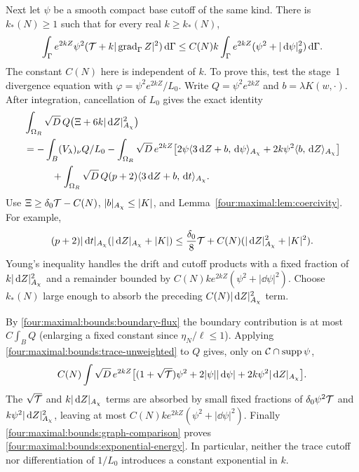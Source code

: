 Next let $\psi$ be a smooth compact base cutoff of the same kind.
There is $k_*(N)\ge1$ such that for every real $k\ge k_*(N)$,
\begin{equation}\label{four:maximal:bounds:exponential-energy}
 \int_\Gamma e^{2kZ}\psi^2
        (\mathcal T+k|\operatorname{grad}_\Gamma Z|^2)\,\mathrm d\Gamma
 \le C(N)k\int_\Gamma e^{2kZ}
               (\psi^2+|\,\mathrm d\psi|_g^2)\,\mathrm d\Gamma.
\end{equation}
The constant $C(N)$ here is independent of $k$. To prove this, test
the stage~1 divergence equation with
$\varphi=\psi^2e^{2kZ}/L_0$. Write
$Q=\psi^2e^{2kZ}$ and $b=\lambda K(w,\cdot)$.
After integration, cancellation of $L_0$ gives the exact identity
\begin{align*}
 &\int_{\Omega_R}\sqrt D\,Q
       \bigl(\Xi+6k|\,\mathrm d Z|_{A_\chi}^2\bigr)\\
 &=-\int_B(V_\lambda)_\nu Q/L_0
   -\int_{\Omega_R}\sqrt D\,e^{2kZ}
       \bigl[2\psi\langle3\,\mathrm d Z+b,\,\mathrm d\psi\rangle_{A_\chi}
          +2k\psi^2\langle b,\,\mathrm d Z\rangle_{A_\chi}\bigr]\\
 &\hspace{1cm}
   +\int_{\Omega_R}\sqrt D\,Q(p+2)
                    \langle3\,\mathrm d Z+b,\,\mathrm d t\rangle_{A_\chi}.
\end{align*}
Use $\Xi\ge\delta_0\mathcal T-C(N)$, $|b|_{A_\chi}\le|K|$, and
Lemma~\ref{four:maximal:lem:coercivity}. For example,
\[
 (p+2)|\,\mathrm d t|_{A_\chi}(|\,\mathrm d Z|_{A_\chi}+|K|)
 \le\frac{\delta_0}{8}\mathcal T
               +C(N)(|\,\mathrm d Z|_{A_\chi}^2+|K|^2).
\]
Young's inequality handles the drift and cutoff products with a
fixed fraction of $k|\,\mathrm d Z|_{A_\chi}^2$ and a remainder bounded by
$C(N)k e^{2kZ}(\psi^2+|\dd\psi|^2)$. Choose $k_*(N)$ large enough
to absorb the preceding $C(N)|\,\mathrm d Z|_{A_\chi}^2$ term.

By \eqref{four:maximal:bounds:boundary-flux} the boundary contribution is at most
$C\int_B Q$ (enlarging a fixed constant since $\eta_N/\ell\le1$).
Applying \eqref{four:maximal:bounds:trace-unweighted} to $Q$ gives, only on
$\mathcal C\cap\operatorname{supp}\psi$,
\[
 C(N)\int\sqrt D\,e^{2kZ}
   \bigl[(1+\sqrt{\mathcal T})\psi^2
       +2|\psi||\,\mathrm d\psi|+2k\psi^2|\,\mathrm d Z|_{A_\chi}\bigr].
\]
The $\sqrt{\mathcal T}$ and $k|\,\mathrm d Z|_{A_\chi}$ terms are absorbed by
small fixed fractions of $\delta_0\psi^2\mathcal T$ and
$k\psi^2|\,\mathrm d Z|_{A_\chi}^2$, leaving at most
$C(N)k e^{2kZ}(\psi^2+|\dd\psi|^2)$.
Finally \eqref{four:maximal:bounds:graph-comparison} proves
\eqref{four:maximal:bounds:exponential-energy}. In particular, neither the trace
cutoff nor differentiation of $1/L_0$ introduces a constant exponential
in $k$.

